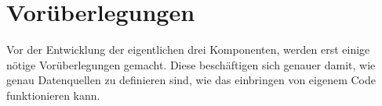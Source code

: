 \section{Vorüberlegungen}

Vor der Entwicklung der eigentlichen drei Komponenten, werden erst einige nötige Vorüberlegungen gemacht.
Diese beschäftigen sich genauer damit, wie genau Datenquellen zu definieren sind, wie das einbringen von eigenem Code funktionieren kann.


